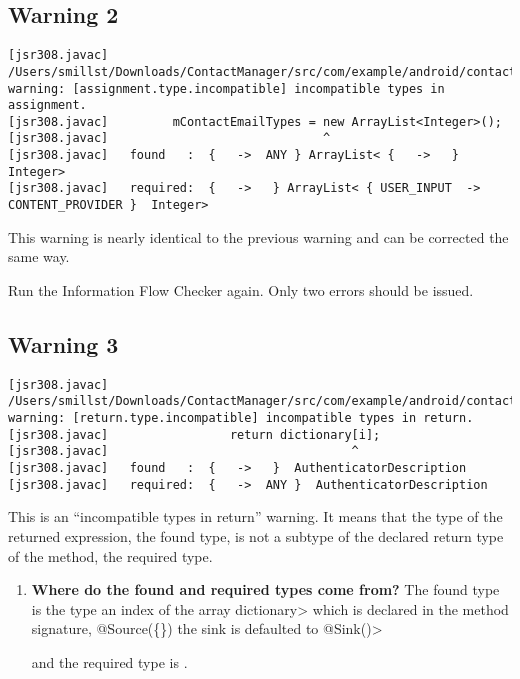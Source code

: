  \subsection{Warning 2}
 \begin{Verbatim}
[jsr308.javac] /Users/smillst/Downloads/ContactManager/src/com/example/android/contactmanager/ContactAdder.java:101: warning: [assignment.type.incompatible] incompatible types in assignment.
[jsr308.javac]         mContactEmailTypes = new ArrayList<Integer>();
[jsr308.javac]                              ^
[jsr308.javac]   found   :  {   ->  ANY } ArrayList< {   ->   }  Integer>
[jsr308.javac]   required:  {   ->   } ArrayList< { USER_INPUT  ->  CONTENT_PROVIDER }  Integer>
\end{Verbatim} 
This warning is nearly identical to the previous warning and can be corrected the same way.
 
   Run the Information Flow Checker again.  Only two errors should be issued.


  \subsection{Warning 3 }
   \begin{Verbatim}
[jsr308.javac] /Users/smillst/Downloads/ContactManager/src/com/example/android/contactmanager/ContactAdder.java:282: warning: [return.type.incompatible] incompatible types in return.
[jsr308.javac]                 return dictionary[i];
[jsr308.javac]                                  ^
[jsr308.javac]   found   :  {   ->   }  AuthenticatorDescription
[jsr308.javac]   required:  {   ->  ANY }  AuthenticatorDescription
\end{Verbatim} 
This is an ``incompatible types in return'' warning.  It means that the type
of the returned expression, the found type, is not a subtype of the declared  
return type of the method, the required type.

 \begin{enumerate}

\item\textbf{Where do the found and required types come from?}
 The found type is the type an index of the array \<dictionary> which is declared in the method signature, \<@Source(\{\}) the sink is defaulted to \<@Sink({})>
 
 and the required type is .


 \end{enumerate}

